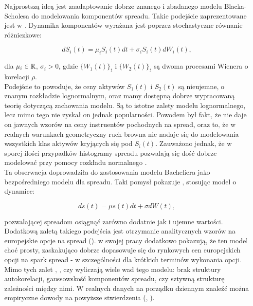 Najprostszą ideą jest zaadaptowanie dobrze znanego i zbadanego modelu Blacka-Scholesa \cite{Black_Scholes} do modelowania komponentów spreadu. Takie podejście zaprezentowane jest w \cite{Bjerksund_Spread_Options_Lognormal}. Dynamika komponentów wyrażana jest poprzez stochastyczne równanie różniczkowe:

$$ dS_i(t) = \mu_i S_i(t)dt + \sigma_i S_i(t)dW_i(t),$$

dla $\mu_i \in \mathbb{R}$, $\sigma_i >0$, gdzie $\{W_1(t)\}_t$ i $\{W_2(t)\}_t$ są dwoma procesami Wienera o korelacji $\rho$.\\

Podejście to powoduje, że ceny aktywów $S_1(t)$ i $S_2(t)$ są nieujemne, o znanym rozkładzie lognormalnym, oraz mamy dostępną dobrze wypracowaną teorię dotyczącą zachowania modelu. Są to istotne zalety modelu lognormalnego, lecz mimo tego nie zyskał on jednak popularności. Powodem był fakt, że nie daje on jawnych wzorów na ceny instruentów pochodnych na spread, oraz to, że w realnych warunkach geometryczny ruch browna nie nadaje się do modelowania wszystkich klas aktywów kryjących się pod $S_i(t)$. Zauważono jednak, że w sporej ilości przypadków histogramy spreadu pozwalają się dość dobrze modelować przy pomocy rozkładu normalnego \cite{Carmona_Spread_Options}.\\
Ta obserwacja doprowadziła do zastosowania modelu Bacheliera jako bezpośredniego modelu dla spreadu. Taki pomysł pokazuje \cite{Poitras_Spread_Options_Arithmetic}, stosując model o dynamice:

$$ ds(t) = \mu s(t) dt + \sigma dW(t),$$

pozwalającej spreadom osiągnąć zarówno dodatnie jak i ujemne wartości. Dodatkową zaletą takiego podejścia jest otrzymanie analitycznych wzorów na europejskie opcje na spread (\cite{Poitras_Spread_Options_Arithmetic}). \cite{Carmona_Spread_Options} w swojej pracy dodatkowo pokazują, że ten model choć prosty, zaskakująco dobrze  dopasowuje się do rynkowych cen europejskich opcji na spark spread - w szczególności dla krótkich terminów wykonania opcji.\\
Mimo tych zalet \cite{Herath_Copula_Crack_Spread}, \cite{Carmona_Spread_Options}, czy \cite{Kim_NonNormal_Spread} wyliczają wiele wad tego modelu: brak struktury autokorelacji, gaussowskość komponentów spreadu, czy sztywną strukturę zależności między nimi. W realnych danych na porządku dziennym znaleźć można empiryczne dowody na powyższe stwierdzenia (\cite{Kim_NonNormal_Spread}, \cite{Schwartz_Ornstein}).

